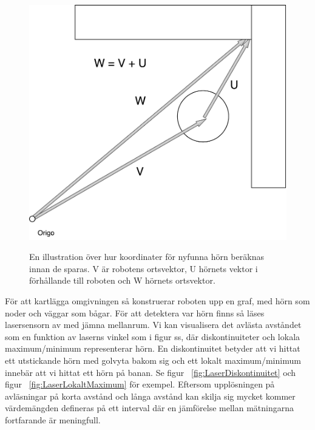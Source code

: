 \documentclass{article}
\begin{document}
\begin{figure}[H]
  \centering
  \includegraphics[scale=0.5]{Koordinatberakning} \\
  \caption{En illustration över hur koordinater för nyfunna hörn beräknas innan de sparas. V är robotens ortsvektor, U hörnets vektor i förhållande till roboten och W hörnets ortsvektor.}
  \label{fig:Koordinatberakning}
\end{figure}

För att kartlägga omgivningen så konstruerar roboten upp en graf, med hörn som noder och väggar som bågar. För att detektera var hörn finns så läses lasersensorn av med jämna mellanrum. Vi kan visualisera det avlästa avståndet som en funktion av laserns vinkel som i figur ss, där diskontinuiteter och lokala maximum/minimum representerar hörn. En diskontinuitet betyder att vi hittat ett utstickande hörn med golvyta bakom sig och ett lokalt maximum/minimum innebär att vi hittat ett hörn på banan. Se figur ~\ref{fig:LaserDiskontinuitet} och figur ~\ref{fig:LaserLokaltMaximum} för exempel. Eftersom upplösningen på avläsningar på korta avstånd och långa avstånd kan skilja sig mycket kommer värdemängden defineras på ett interval där en jämförelse mellan mätningarna fortfarande är meningfull.
\end{document}
